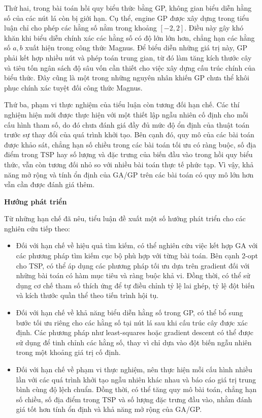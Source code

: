 Thứ hai, trong bài toán hồi quy biểu thức bằng GP, không gian biểu diễn
hằng số của các nút lá còn bị giới hạn. Cụ thể, engine GP được xây dựng
trong tiểu luận chỉ cho phép các hằng số nằm trong khoảng $[-2,2]$.
Điều này gây khó khăn khi biểu diễn chính xác các hằng số có độ lớn
lớn hơn, chẳng hạn các hằng số $a, b$ xuất hiện trong công thức Magnus.
Để biểu diễn những giá trị này, GP phải kết hợp nhiều nút và phép toán
trung gian, từ đó làm tăng kích thước cây và tiêu tốn ngân sách độ sâu
vốn cần thiết cho việc xây dựng cấu trúc chính của biểu thức. Đây cũng
là một trong những nguyên nhân khiến GP chưa thể khôi phục chính xác
tuyệt đối công thức Magnus.

Thứ ba, phạm vi thực nghiệm của tiểu luận còn tương đối hạn chế. Các
thí nghiệm hiện mới được thực hiện với một thiết lập ngẫu nhiên cố
định cho mỗi cấu hình tham số, do đó chưa đánh giá đầy đủ mức độ ổn
định của thuật toán trước sự thay đổi của quá trình khởi tạo. Bên cạnh
đó, quy mô của các bài toán được khảo sát, chẳng hạn số chiều trong các
bài toán tối ưu có ràng buộc, số địa điểm trong TSP hay số lượng và
đặc trưng của biến đầu vào trong hồi quy biểu thức, vẫn còn tương đối
nhỏ so với nhiều bài toán thực tế phức tạp. Vì vậy, khả năng mở rộng và
tính ổn định của GA/GP trên các bài toán có quy mô lớn hơn vẫn cần
được đánh giá thêm.

\bigskip
\noindent\textbf{Hướng phát triển}
\medskip

Từ những hạn chế đã nêu, tiểu luận đề xuất một số hướng phát triển cho
các nghiên cứu tiếp theo:

\begin{itemize}
    \item Đối với hạn chế về hiệu quả tìm kiếm, có thể nghiên cứu việc
    kết hợp GA với các phương pháp tìm kiếm cục bộ phù hợp với từng
    bài toán. Bên cạnh 2-opt cho TSP, có thể áp dụng các phương pháp
    tối ưu dựa trên gradient đối với những bài toán có hàm mục tiêu và
    ràng buộc khả vi. Đồng thời, có thể sử dụng cơ chế tham số thích
    ứng để tự điều chỉnh tỷ lệ lai ghép, tỷ lệ đột biến và kích thước
    quần thể theo tiến trình hội tụ.

    \item Đối với hạn chế về khả năng biểu diễn hằng số trong GP, có
    thể bổ sung bước tối ưu riêng cho các hằng số tại nút lá sau khi
    cấu trúc cây được xác định. Các phương pháp như least-squares hoặc
    gradient descent có thể được sử dụng để tinh chỉnh các hằng số,
    thay vì chỉ dựa vào đột biến ngẫu nhiên trong một khoảng giá trị
    cố định.

    \item Đối với hạn chế về phạm vi thực nghiệm, nên thực hiện mỗi
    cấu hình nhiều lần với các quá trình khởi tạo ngẫu nhiên khác
    nhau và báo cáo giá trị trung bình cùng độ lệch chuẩn. Đồng thời,
    có thể tăng quy mô bài toán, chẳng hạn số chiều, số địa điểm trong
    TSP và số lượng đặc trưng đầu vào, nhằm đánh giá tốt hơn tính ổn
    định và khả năng mở rộng của GA/GP.
\end{itemize}
